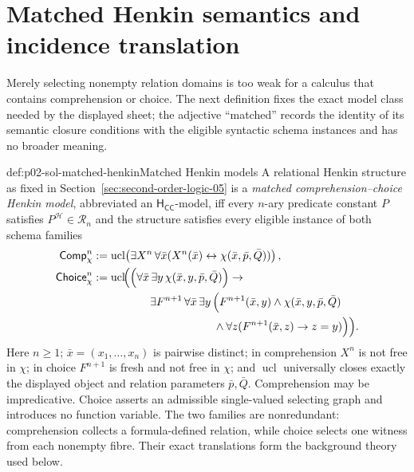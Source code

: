 \section{Matched Henkin semantics and incidence translation}
\label{sec:p02-sol-matched-calculus}

Merely selecting nonempty relation domains is too weak for a calculus that
contains comprehension or choice.  The next definition fixes the exact model
class needed by the displayed sheet; the adjective ``matched'' records the
identity of its semantic closure conditions with the eligible syntactic schema
instances and has no broader meaning.

\begin{hbdefinition}{def:p02-sol-matched-henkin}{Matched Henkin models}
A relational Henkin structure as fixed in
Section~\ref{sec:second-order-logic-05} is a \emph{matched
comprehension--\allowbreak choice Henkin model}, abbreviated an
\(\mathsf{H}_{\mathsf{CC}}\)-model, iff every \(n\)-ary predicate constant
\(P\) satisfies \(P^{\mathcal H}\in\mathcal R_n\) and the structure satisfies
every eligible instance of both schema families
\[
\begin{aligned}
\mathsf{Comp}_{\chi}^{n}&\defeq
 \operatorname{ucl}\!\left(\exists X^n\,\forall\bar x
   (X^n(\bar x)\leftrightarrow\chi(\bar x,\bar p,\bar Q))\right),\\
\mathsf{Choice}_{\chi}^{n}&\defeq
 \operatorname{ucl}\!\Bigl(\Bigl(\forall\bar x\,\exists y\,
 \chi(\bar x,y,\bar p,\bar Q)\Bigr)\to{}\\
&\hspace{18mm}\exists F^{n+1}\,\forall\bar x\,\exists y\,
 \Bigl(F^{n+1}(\bar x,y)\land\chi(\bar x,y,\bar p,\bar Q)\\
&\hspace{38mm}\land
 \forall z(F^{n+1}(\bar x,z)\to z=y)\Bigr)\Bigr).
\end{aligned}
\]
Here \(n\geq1\); \(\bar x=(x_1,\ldots,x_n)\) is pairwise distinct; in
comprehension \(X^n\) is not free in \(\chi\); in choice \(F^{n+1}\) is fresh
and not free in \(\chi\); and \(\operatorname{ucl}\) universally closes
exactly the displayed object and relation parameters \(\bar p,\bar Q\).
Comprehension may be impredicative.  Choice asserts an admissible single-valued
selecting graph and introduces no function variable.  The two families are
nonredundant: comprehension collects a formula-defined relation, while choice
selects one witness from each nonempty fibre.  Their exact translations form
the background theory used below.
\end{hbdefinition}

